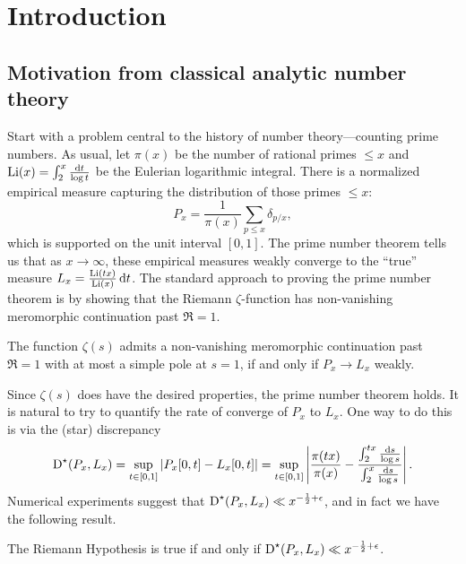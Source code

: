 
\chapter{Introduction}





\section{Motivation from classical analytic number theory}

Start with a problem central to the history of number theory---counting 
prime numbers. As usual, let $\pi(x)$ be the number of rational primes 
$\leqslant x$ and $\operatorname{Li}(x) = \int_2^x \frac{\mathrm{d} t}{\log t}$ be the 
Eulerian logarithmic integral. There is a normalized empirical measure 
capturing the distribution of those primes $\leqslant x$: 
\[
	P_x = \frac{1}{\pi(x)} \sum_{p\leqslant x} \delta_{p/x} ,
\]
which is supported on the unit interval $[0,1]$. The prime number theorem 
tells us that as $x\to \infty$, these empirical measures weakly converge to the 
``true'' measure $L_x = \frac{\operatorname{Li}(t x)}{\operatorname{Li}(x)}\, \mathrm{d} t$. The standard approach 
to proving the prime number theorem is by showing that the Riemann 
$\zeta$-function has non-vanishing meromorphic continuation past $\Re = 1$.

\begin{theorem}
The function $\zeta(s)$ admits a non-vanishing meromorphic continuation past 
$\Re = 1$ with at most a simple pole at $s=1$, if and only if 
$P_x \to L_x$ weakly. 
\end{theorem}

Since $\zeta(s)$ does have the desired properties, the prime number 
theorem holds. 
It is natural to try to quantify the rate of converge of $P_x$ to $L_x$. One 
way to do this is via the (star) discrepancy 
\[
	\operatorname{D}^\star(P_x,L_x) 
		= \sup_{t\in [0,1]} \left| P_x[0,t] - L_x[0,t]\right|
		= \sup_{t\in [0,1]} \left| \frac{\pi(t x)}{\pi(x)} - \frac{\int_2^{tx} \frac{\mathrm{d} s}{\log s}}{\int_2^x \frac{\mathrm{d} s}{\log s}}\right| .
\]
Numerical experiments suggest that 
$\operatorname{D}^\star(P_x,L_x) \ll x^{-\frac 1 2+\epsilon}$, and in fact we have the 
following result. 

\begin{theorem}
The Riemann Hypothesis is true if and only if 
$\operatorname{D}^\star(P_x,L_x) \ll x^{-\frac 1 2+\epsilon}$. 
\end{theorem}

